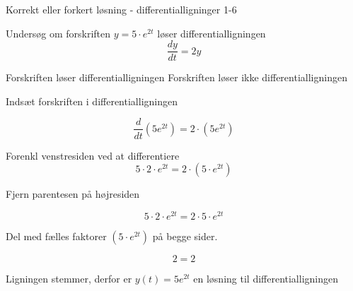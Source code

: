 \documentclass{article}
\begin{document}
\begin{exercise}{Korrekt eller forkert løsning - differentialligninger 1-6}
	
	
	Undersøg om forskriften $y = 5 \cdot e^{2t}$ løser differentialligningen
	\[
	\frac{dy}{dt} = 2y
	\]
	
\begin{multichoice}
	\itemtrue Forskriften løser differentialligningen 
	\itemfalse Forskriften løser ikke differentialligningen 
\end{multichoice}
	
	\hint
	
	Indsæt forskriften i differentialligningen
	
	\hint
	\[
	\frac{d}{dt} \left( 5 e^{2t}\right) = 2 \cdot \left( 5 e^{2t} \right)
	\]
	
	
	\hint
	
	Forenkl venstresiden ved at differentiere
	\[
	5 \cdot 2 \cdot e^{2t} = 2 \cdot \left(5 \cdot e^{2t} \right)
	\]
	
	\hint
	
	Fjern parentesen på højresiden
	
	\hint
	\[
	5 \cdot 2 \cdot e^{2t} = 2 \cdot 5 \cdot e^{2t}
	\]
	
	\hint
	Del med fælles faktorer $\left( 5 \cdot e^{2t} \right)$ på begge sider.
	
	\hint
	
	\[
	2 = 2
	\]
	
	
	\hint
	
	Ligningen stemmer, derfor er $y(t) = 5 e^{2t}$ en løsning til differentialligningen
	
\end{exercise}

\newpage
\end{document}

